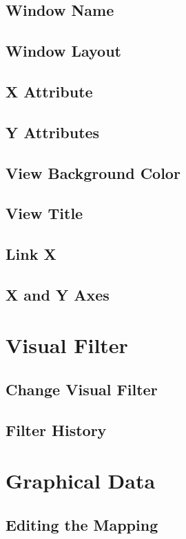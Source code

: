 \subsection{Window Name}
\subsection{Window Layout}
\subsection{X Attribute}
\subsection{Y Attributes}
\subsection{View Background Color}
\subsection{View Title}
\subsection{Link X}
\subsection{X and Y Axes}

\section{Visual Filter}

\subsection{Change Visual Filter}
\subsection{Filter History}

\section{Graphical Data}

\subsection{Editing the Mapping}

